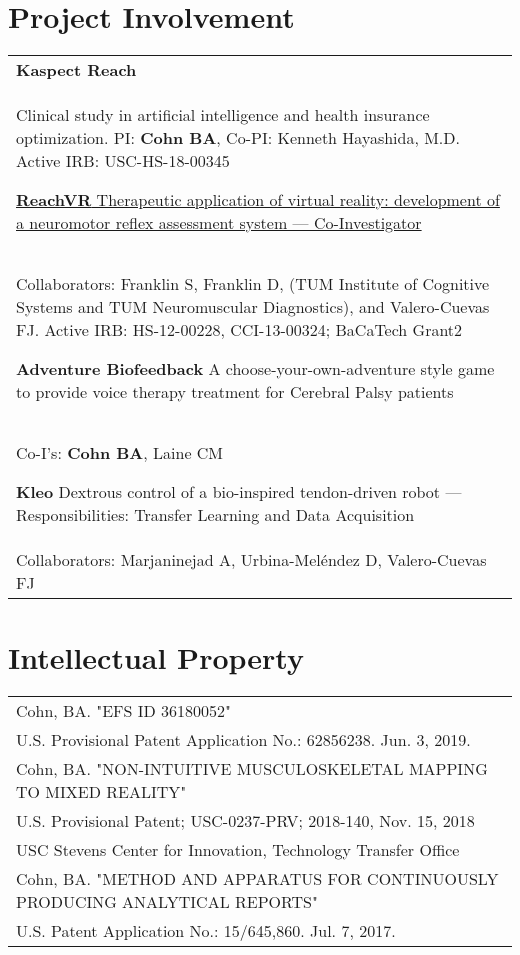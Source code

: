 \documentclass[10pt,a4paper]{article}
\begin{document}
\vspace*{3mm}\section*{Project Involvement}


  \vspace*{1mm}
  \begin{tabularx}{17cm}{X}
  \textbf{Kaspect Reach} \\
  Clinical study in artificial intelligence and health insurance optimization.
  PI: \textbf{Cohn BA}, Co-PI: Kenneth Hayashida, M.D.
  Active IRB: USC-HS-18-00345

  \vspace*{3mm}
  \href{http://www.bacatec.de/en/gefoerderte_projekte.html}{\textbf{ReachVR} Therapeutic application of virtual reality: development of a neuromotor reflex assessment system --- Co-Investigator}\\
  Collaborators: Franklin S, Franklin D, (TUM Institute of Cognitive Systems and TUM Neuromuscular Diagnostics), and Valero-Cuevas FJ.
  Active IRB: HS-12-00228, CCI-13-00324; BaCaTech Grant2

  \vspace*{3mm}
  \textbf{Adventure Biofeedback} A choose-your-own-adventure style game to provide voice therapy treatment for Cerebral Palsy patients \\
  Co-I's: \textbf{Cohn BA}, Laine CM

  \vspace*{3mm}
  \textbf{Kleo} Dextrous control of a bio-inspired tendon-driven robot --- Responsibilities: Transfer Learning and Data Acquisition\\
  Collaborators: Marjaninejad A, Urbina-Mel\'{e}ndez D, Valero-Cuevas FJ

  \end{tabularx}


\vspace*{3mm}\section*{Intellectual Property}

  \vspace*{1mm}
  \begin{tabularx}{17cm}{X}


Cohn, BA. "EFS ID 36180052"\\
 U.S. Provisional Patent Application No.: 62856238. Jun. 3, 2019.\\[2mm]

Cohn, BA. "NON-INTUITIVE MUSCULOSKELETAL MAPPING TO MIXED REALITY"\\
 U.S. Provisional Patent; USC-0237-PRV; 2018-140, Nov. 15, 2018\\
 USC Stevens Center for Innovation, Technology Transfer Office\\[2mm]

 Cohn, BA. "METHOD AND APPARATUS FOR CONTINUOUSLY PRODUCING ANALYTICAL REPORTS"\\
 U.S. Patent Application No.: 15/645,860. Jul. 7, 2017.\\[2mm]


  \end{tabularx}
\end{document}
